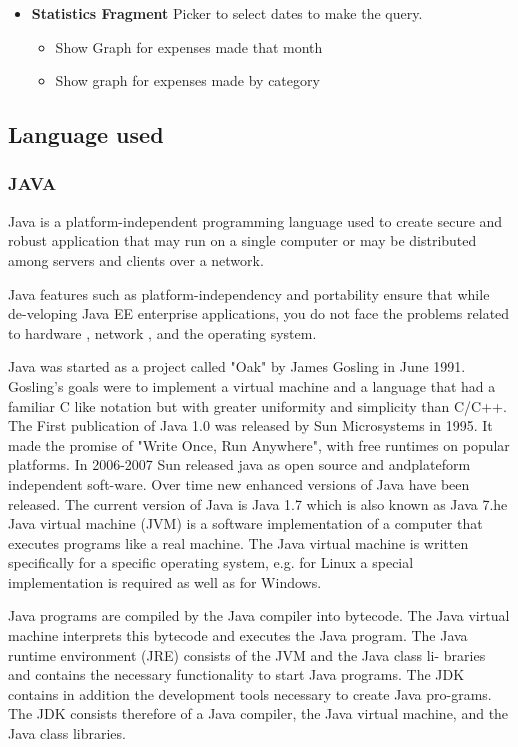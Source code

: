 \begin{itemize}
\begin{itemize}
\item \textbf{Statistics Fragment}
Picker to select dates to make the query.
\begin{itemize}
	\item Show Graph for expenses made that month
\item Show graph for expenses made by category
\end{itemize}



\end{itemize}
\end{itemize}


\subsection{Language used}
\subsubsection{JAVA}

Java is a platform-independent programming language used to create secure
and robust application that may run on a single computer or may be distributed
among servers and clients over a network.

Java features such as platform-independency and portability ensure that while
de-veloping Java EE enterprise applications, you do not face the problems
related to hardware , network , and the operating system.

Java was started as a project called "Oak" by James Gosling in June 1991.
Gosling's goals were to implement a virtual machine and a language that had a
familiar C like notation but with greater uniformity and simplicity than C/C++.
The First publication of Java 1.0 was released by Sun Microsystems in 1995. It
made the promise of "Write Once, Run Anywhere", with free runtimes on
popular platforms. In 2006-2007 Sun released java as open source and
andplateform independent soft-ware. Over time new enhanced versions of Java
have been released. The current version of Java is Java 1.7 which is also
known as Java 7.he Java virtual machine (JVM) is a software implementation of
a computer that executes programs like a real machine. The Java virtual
machine is written specifically for a specific operating system, e.g. for Linux a
special implementation is required as well as for Windows.

Java programs are compiled by the Java compiler into bytecode. The Java
virtual machine interprets this bytecode and executes the Java program.
The Java runtime environment (JRE) consists of the JVM and the Java class li-
braries and contains the necessary functionality to start Java programs.
The JDK contains in addition the development tools necessary to create Java
pro-grams. The JDK consists therefore of a Java compiler, the Java virtual
machine, and the Java class libraries.

